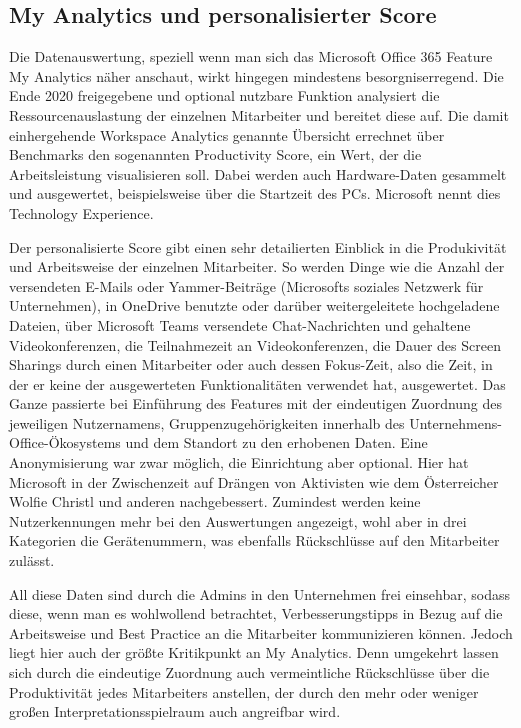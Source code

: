 \subsection{My Analytics und personalisierter Score}
Die Datenauswertung, speziell wenn man sich das Microsoft Office 365 Feature \glqq My Analytics\grqq{} näher anschaut, wirkt hingegen mindestens besorgniserregend. Die Ende 2020 freigegebene und optional nutzbare Funktion analysiert die Ressourcenauslastung der einzelnen Mitarbeiter und bereitet diese auf. Die damit einhergehende \glqq Workspace Analytics\grqq{} genannte Übersicht errechnet über Benchmarks den sogenannten \glqq Productivity Score\grqq{}, ein Wert, der die Arbeitsleistung visualisieren soll. Dabei werden auch Hardware-Daten gesammelt und ausgewertet, beispielsweise über die Startzeit des PCs. Microsoft nennt dies \glqq Technology Experience\grqq{}.

Der personalisierte Score gibt einen sehr detailierten Einblick in die Produkivität und Arbeitsweise der einzelnen Mitarbeiter. So werden Dinge wie die Anzahl der versendeten E-Mails oder Yammer-Beiträge (Microsofts soziales Netzwerk für Unternehmen), in OneDrive benutzte oder darüber weitergeleitete hochgeladene Dateien, über Microsoft Teams versendete Chat-Nachrichten und gehaltene Videokonferenzen, die Teilnahmezeit an Videokonferenzen, die Dauer des Screen Sharings durch einen Mitarbeiter oder auch dessen \glqq Fokus-Zeit\grqq{}, also die Zeit, in der er keine der ausgewerteten Funktionalitäten verwendet hat, ausgewertet. Das Ganze passierte bei Einführung des Features mit der eindeutigen Zuordnung des jeweiligen Nutzernamens, Gruppenzugehörigkeiten innerhalb des Unternehmens-Office-Ökosystems und dem Standort zu den erhobenen Daten. Eine Anonymisierung war zwar möglich, die Einrichtung aber optional. Hier hat Microsoft in der Zwischenzeit auf Drängen von Aktivisten wie dem Österreicher Wolfie Christl und anderen nachgebessert. Zumindest werden keine Nutzerkennungen mehr bei den Auswertungen angezeigt, wohl aber in drei Kategorien die Gerätenummern, was ebenfalls Rückschlüsse auf den Mitarbeiter zulässt.

All diese Daten sind durch die Admins in den Unternehmen frei einsehbar, sodass diese, wenn man es wohlwollend betrachtet, Verbesserungstipps in Bezug auf die Arbeitsweise und Best Practice an die Mitarbeiter kommunizieren können. Jedoch liegt hier auch der größte Kritikpunkt an My Analytics. Denn umgekehrt lassen sich durch die eindeutige Zuordnung auch vermeintliche Rückschlüsse über die Produktivität jedes Mitarbeiters anstellen, der durch den mehr oder weniger großen Interpretationsspielraum auch angreifbar wird.

